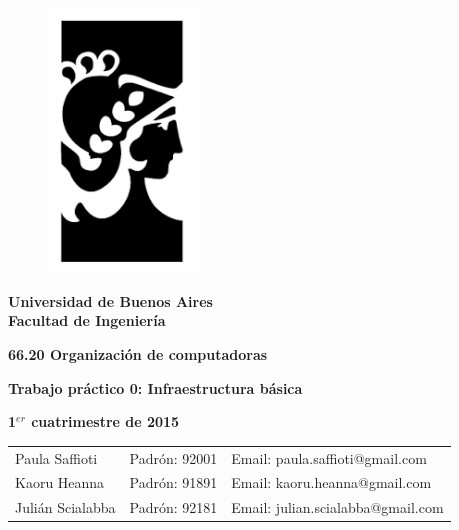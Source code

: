 \documentclass[a4paper,11pt]{article}
\title{\textbf{}}
\author{}
\date{}
\begin{document}
\begin{titlepage}
\begin{center}

\vspace*{-1in}
\begin{figure}[htb]
\begin{center}
\includegraphics[width=4cm]{logo.png}
\end{center}
\end{figure}
	
\begin{huge}
\textbf{Universidad de Buenos Aires\\
Facultad de Ingenier\'ia \\}
\vspace*{0.2in}
\end{huge}

\begin{LARGE}
\textbf{66.20 Organizaci\'on de computadoras \\}
\vspace*{1in}
\end{LARGE}

\begin{LARGE}
\textbf{Trabajo pr\'actico 0:
Infraestructura b\'asica \\
}
\end{LARGE}
\begin{LARGE}
\textbf{1$^{er}$ cuatrimestre de 2015} \\
\end{LARGE}

\vspace*{1in}

\begin{Large}
\begin{tabular}{ l l l }
   Paula Saffioti & Padr\'on: 92001 & Email: paula.saffioti@gmail.com \\
   Kaoru Heanna & Padr\'on: 91891 & Email: kaoru.heanna@gmail.com \\
   Juli\'an Scialabba & Padr\'on: 92181 & Email: julian.scialabba@gmail.com \\
 \end{tabular}\\
\end{Large}

\end{center}
\end{titlepage}
\end{document}
